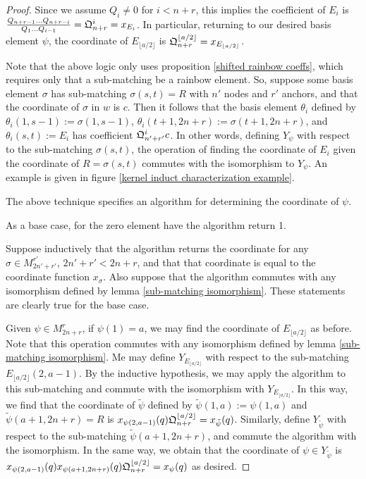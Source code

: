 \documentclass{amsart}
\begin{document}
\begin{proof}
	Since we assume $Q_i\not=0$ for $i< n+r$, this implies the coefficient of $E_i$ is $\frac{Q_{n+r-1}...Q_{n+r-i}}{Q_1...Q_{i-1}}=\mathfrak{Q}^i_{n+r}=x_{E_i}$. In particular, returning to our desired basis element $\psi$, the coordinate of $E_{\lfloor a/2\rfloor}$ is $\mathfrak{Q}^{\lfloor a/2\rfloor}_{n+r}=x_{E_{\lfloor a/2\rfloor}}$.
	
	Note that the above logic only uses proposition \ref{shifted rainbow coeffs}, which requires only that a sub-matching be a rainbow element. So, suppose some basis element $\sigma$ has sub-matching $\sigma(s,t)=R$ with $n'$ nodes and $r'$ anchors, and that the coordinate of $\sigma$ in $w$ is $c$. Then it follows that the basis element $\theta_i$ defined by $\theta_i(1,s-1):=\sigma(1,s-1)$, $\theta_i(t+1,2n+r):=\sigma(t+1,2n+r)$, and $\theta_i(s,t):=E_i$ has coefficient $\mathfrak{Q}^i_{n'+r'}c$. In other words, defining $Y_\psi$ with respect to the sub-matching $\sigma(s,t)$, the operation of finding the coordinate of $E_i$ given the coordinate of $R=\sigma(s,t)$ commutes with the isomorphism to $Y_\psi$.  An example is given in figure \ref{kernel induct characterization example}.
	
	\vspace{2mm}
	The above technique specifies an algorithm for determining the coordinate of $\psi$. 
	
	As a base case, for the zero element have the algorithm return 1.
	
	Suppose inductively that the algorithm returns the coordinate for any $\sigma\in M_{2n'+r'}^{r'}$, $2n'+r'<2n+r$, and that that coordinate is equal to the coordinate function $x_\sigma$. Also suppose that the algorithm commutes with any isomorphism defined by lemma \ref{sub-matching isomorphism}. These statements are clearly true for the base case. 
	
	Given $\psi\in M_{2n+r}^r$, if $\psi(1)=a$, we may find the coordinate of $E_{\lfloor a/2\rfloor}$ as before. Note that this operation commutes with any isomorphism defined by lemma \ref{sub-matching isomorphism}. Me may define $Y_{E_{\lfloor a/2\rfloor}}$ with respect to the sub-matching $E_{\lfloor a/2\rfloor}(2,a-1)$. By the inductive hypothesis, we may apply the algorithm to this sub-matching and commute with the isomorphism with $Y_{E_{\lfloor a/2\rfloor}}$. In this way, we find that the coordinate of $\tilde{\psi}$ defined by $\tilde{\psi}(1,a):=\psi(1,a)$ and $\tilde{\psi}(a+1,2n+r)=R$ is $x_{\psi(2,a-1)}(q)\mathfrak{Q}^{\lfloor a/2\rfloor}_{n+r}=x_{\tilde{\psi}}(q)$. Similarly, define $Y_{\tilde{\psi}}$ with respect to the sub-matching $\tilde{\psi}(a+1,2n+r)$, and commute the algorithm with the isomorphism. In the same way, we obtain that the coordinate of $\psi\in Y_{\tilde{\psi}}$ is $x_{\psi(2,a-1)}(q)x_{\psi(a+1,2n+r)}(q)\mathfrak{Q}^{\lfloor a/2\rfloor}_{n+r}=x_\psi(q)$ as desired.
	

\end{proof}
\end{document}
